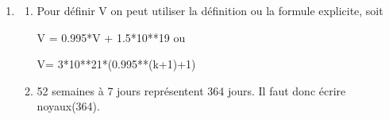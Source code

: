\begin{enumerate}
$v_n < 4,5 \times 10^{21} \iff 3 \times 10^{21}\left(0,995^n + 1\right) < 4,5 \times 10^{21} \iff 3\left(0,995^n + 1\right) < 4,5 \iff 0,995^n + 1 < 1,5 \iff 0,995^n < 0,5 \iff n \ln 0,995 < \ln 0,5 \iff n > \dfrac{\ln 0,5}{\ln 0,995}$ (car $\ln 0,995 < 0$).

La calculatrice donne $\dfrac{\ln 0,5}{\ln 0,995} \approx 138,3$.

Le nombre de noyaux de polonium sera inférieur à $4,5 \times 10^{21}$ au bout de 139 jours.
\item %



	\begin{enumerate}
		\item %
Pour définir V on peut utiliser la définition ou la formule explicite, soit 

V = 0.995*V + 1.5*10**19 ou

V= 3*10**21*(0.995**(k+1)+1)
		\item %
52 semaines à 7 jours représentent 364 jours. Il faut donc écrire noyaux(364).
	\end{enumerate}
\end{enumerate}

\medskip

